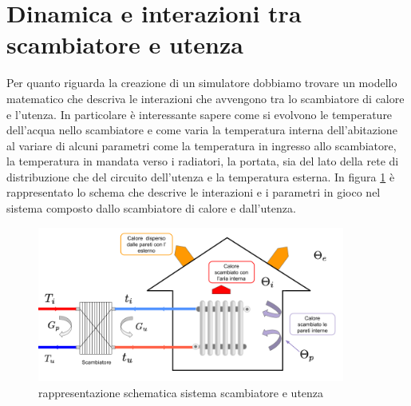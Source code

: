 \documentclass[laurea,oneside,11pt]{USiena_tesiLM}
\begin{document}
%
%
%

\section{Dinamica e interazioni tra scambiatore e utenza}
Per quanto riguarda la creazione di un simulatore dobbiamo trovare un modello matematico che descriva le interazioni che avvengono tra lo scambiatore di calore e l'utenza. In particolare è interessante sapere come si evolvono le temperature dell'acqua nello scambiatore e come varia la temperatura interna dell'abitazione al variare di alcuni parametri come la temperatura in ingresso allo scambiatore, la temperatura in mandata verso i radiatori, la portata, sia del lato della rete di distribuzione che del circuito dell'utenza e la temperatura esterna.
In figura \ref{fig:scamb_utenza} è rappresentato lo schema che descrive le interazioni e i parametri in gioco nel sistema composto dallo scambiatore di calore e dall'utenza. 

\begin{figure}[h]
\begin{center}
\includegraphics[width=0.9\textwidth]{figure/scamb_utenza} %
\caption{rappresentazione schematica sistema scambiatore e utenza}
\label{fig:scamb_utenza}
\end{center}
\end{figure}
\end{document}
